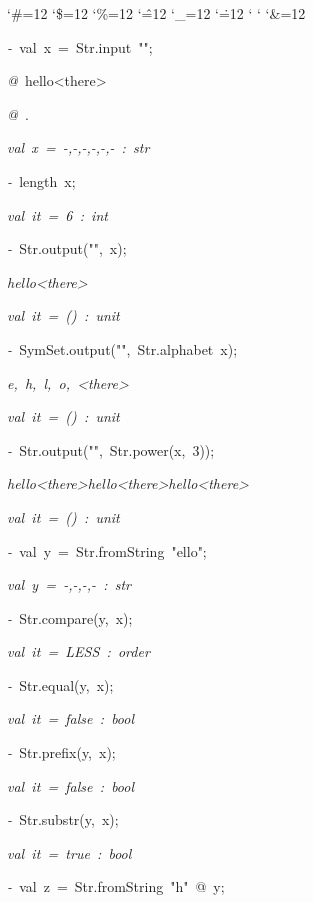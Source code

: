 \begin{list}{}
{\setlength{\leftmargin}{\leftmargini}
\setlength{\rightmargin}{0cm}
\setlength{\itemindent}{0cm}
\setlength{\listparindent}{0cm}
\setlength{\itemsep}{0cm}
\setlength{\parsep}{0cm}
\setlength{\labelsep}{0cm}
\setlength{\labelwidth}{0cm}
\catcode`\#=12
\catcode`\$=12
\catcode`\%=12
\catcode`\^=12
\catcode`\_=12
\catcode`\.=12
\catcode`
\catcode`
\catcode`\&=12
\ttfamily}
\small
\item[]\textsl{-\ }val\ x\ =\ Str.input\ "";
\item[]\textsl{@\ }hello<there>
\item[]\textsl{@\ }.
\item[]\textsl{val\ x\ =\ -,-,-,-,-,-\ :\ str}
\item[]\textsl{-\ }length\ x;
\item[]\textsl{val\ it\ =\ 6\ :\ int}
\item[]\textsl{-\ }Str.output("",\ x);
\item[]\textsl{hello<there>}
\item[]\textsl{val\ it\ =\ ()\ :\ unit}
\item[]\textsl{-\ }SymSet.output("",\ Str.alphabet\ x);
\item[]\textsl{e,\ h,\ l,\ o,\ <there>}
\item[]\textsl{val\ it\ =\ ()\ :\ unit}
\item[]\textsl{-\ }Str.output("",\ Str.power(x,\ 3));
\item[]\textsl{hello<there>hello<there>hello<there>}
\item[]\textsl{val\ it\ =\ ()\ :\ unit}
\item[]\textsl{-\ }val\ y\ =\ Str.fromString\ "ello";
\item[]\textsl{val\ y\ =\ -,-,-,-\ :\ str}
\item[]\textsl{-\ }Str.compare(y,\ x);
\item[]\textsl{val\ it\ =\ LESS\ :\ order}
\item[]\textsl{-\ }Str.equal(y,\ x);
\item[]\textsl{val\ it\ =\ false\ :\ bool}
\item[]\textsl{-\ }Str.prefix(y,\ x);
\item[]\textsl{val\ it\ =\ false\ :\ bool}
\item[]\textsl{-\ }Str.substr(y,\ x);
\item[]\textsl{val\ it\ =\ true\ :\ bool}
\item[]\textsl{-\ }val\ z\ =\ Str.fromString\ "h"\ @\ y;

\end{list}
